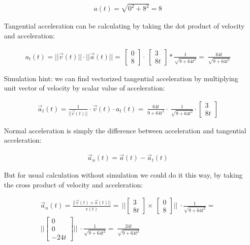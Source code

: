 \documentclass{article}
\begin{document}
\begin{align}
    a(t) = \sqrt{0^2 + 8^2} = 8
\end{align}

Tangential acceleration can be calculating by taking the dot product of velocity and acceleration:

\begin{align}
    a_t(t) = || \vec{v}(t) || \cdot || \vec{a}(t) || = \
    \begin{bmatrix}
        0 \\
        8
    \end{bmatrix} \cdot \
    \begin{bmatrix}
        3 \\
        8t
    \end{bmatrix} * \frac{1}{\sqrt{9 + 64t^2}} = \
    \frac{64t}{\sqrt{9 + 64t^2}}
\end{align}

Simulation hint: we can find vectorized tangential acceleration by multiplying unit vector of velocity by scalar value of acceleration:

\begin{align}
    \vec{a}_t(t) = \frac{1}{|| \vec{v}(t) ||} \cdot \vec{v}(t) \cdot a_t(t) = \
    \frac{64t}{9 + 64t^2} \cdot \
    \frac{1}{\sqrt{9 + 64t^2}} \cdot \begin{bmatrix}
        3 \\
        8t
    \end{bmatrix}
\end{align}

Normal acceleration is simply the difference between acceleration and tangential acceleration:

\begin{align}
    \vec{a}_n(t) = \vec{a}(t) - \vec{a}_t(t)
\end{align}

But for usual calculation without simulation we could do it this way, by taking the cross product of velocity and acceleration:

\begin{align}
    \vec{a}_n(t) = \frac{|| \vec{v}(t) \times \vec{a}(t) ||}{v(t)} = \
    || \begin{bmatrix}
        3 \\
        8t
    \end{bmatrix} \times \
    \begin{bmatrix}
        0 \\
        8
    \end{bmatrix} || \
    \cdot \frac{1}{\sqrt{9 + 64t^2}} = \\
    || \begin{bmatrix}
        0 \\
        0 \\
        -24t
    \end{bmatrix} || \
    \cdot \frac{1}{\sqrt{9 + 64t^2}} = \
    \frac{24t}{\sqrt{9 + 64t^2}}
\end{align}
\end{document}
